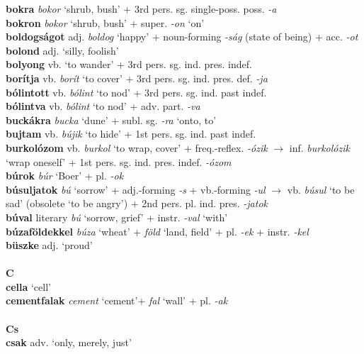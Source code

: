 \documentclass[11pt]{article}
\begin{document}
\textbf{bokra} \emph{bokor} `shrub, bush' + 3rd
pers. sg. single\hyp{}poss. poss. \emph{-a} \\
\textbf{bokron} \emph{bokor} `shrub, bush' + super. \emph{-on} `on' \\
\textbf{boldogságot} adj. \emph{boldog} `happy' + noun\hyp{}forming
  \emph{-ság} (state of being) + acc. \emph{-ot} \\
\textbf{bolond} adj. `silly, foolish' \\
\textbf{bolyong} vb. `to wander' + 3rd pers. sg. ind. pres. indef. \\
\textbf{borítja} vb. \emph{borít} `to cover' + 3rd
pers. sg. ind. pres. def. \emph{-ja} \\
\textbf{bólintott} vb. \emph{bólint} `to nod' + 3rd
pers. sg. ind. past indef. \\
\textbf{bólintva}  vb. \emph{bólint} `to nod' + adv. part. \emph{-va} \\
\textbf{buckákra} \emph{bucka} `dune' + subl. sg. \emph{-ra} `onto, to' \\
\textbf{bujtam} vb. \emph{bújik} `to hide' + 1st pers. sg. ind. past
indef. \\
\textbf{burkolózom} vb. \emph{burkol} `to wrap, cover' +
freq.\hyp{}reflex. \emph{-ózik} $\rightarrow$ inf. \emph{burkolózik}
`wrap oneself' + 1st pers. sg. ind. pres. indef. \emph{-ózom} \\
\textbf{búrok} \emph{búr} `Boer' + pl. \emph{-ok} \\
\textbf{búsuljatok} \emph{bú} `sorrow' + adj.\hyp{}forming \emph{-s}
+ vb.\hyp{}forming \emph{-ul} $\rightarrow$ vb. \emph{búsul} `to be
sad' (obsolete `to be angry') + 2nd pers. pl. ind. pres. \emph{-jatok} \\
\textbf{búval} literary \emph{bú} `sorrow, grief' + instr. \emph{-val}
`with' \\
\textbf{búzaföldekkel} \emph{búza} `wheat' + \emph{föld} `land, field'
+ pl. \emph{-ek} + instr. \emph{-kel} \\
\textbf{büszke} adj. `proud' \\
\ \\
\noindent \textbf{\large C} \\
\textbf{cella} `cell' \\
\textbf{cementfalak} \emph{cement} `cement'+ \emph{fal} `wall' +
pl. \emph{-ak} \\
\ \\
\noindent \textbf{\large Cs} \\
\textbf{csak} adv. `only, merely, just' \\
\end{document}
